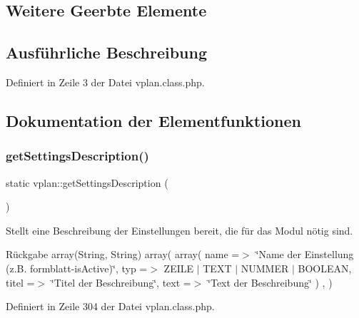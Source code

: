 \subsection*{Weitere Geerbte Elemente}


\subsection{Ausführliche Beschreibung}


Definiert in Zeile 3 der Datei vplan.\+class.\+php.



\subsection{Dokumentation der Elementfunktionen}
\mbox{\label{classvplan_a6b33712013b53420f3ef89c3c6d406ae}} 
\subsubsection{\texorpdfstring{get\+Settings\+Description()}{getSettingsDescription()}}
{\footnotesize\ttfamily static vplan\+::get\+Settings\+Description (\begin{DoxyParamCaption}{ }\end{DoxyParamCaption})\hspace{0.3cm}{\ttfamily [static]}}

Stellt eine Beschreibung der Einstellungen bereit, die für das Modul nötig sind. \begin{DoxyReturn}{Rückgabe}
array(\+String, String) array( array( \textquotesingle{}name\textquotesingle{} =$>$ \char`\"{}\+Name der Einstellung (z.\+B. formblatt-\/is\+Active)\char`\"{}, \textquotesingle{}typ\textquotesingle{} =$>$ Z\+E\+I\+LE $\vert$ T\+E\+XT $\vert$ N\+U\+M\+M\+ER $\vert$ B\+O\+O\+L\+E\+AN, \textquotesingle{}titel\textquotesingle{} =$>$ \char`\"{}\+Titel der Beschreibung\char`\"{}, \textquotesingle{}text\textquotesingle{} =$>$ \char`\"{}\+Text der Beschreibung\char`\"{} ) , ) 
\end{DoxyReturn}


Definiert in Zeile 304 der Datei vplan.\+class.\+php.

\mbox{\label{classvplan_aac77500cfdc4bb62e53666612c2f9dff}} 
